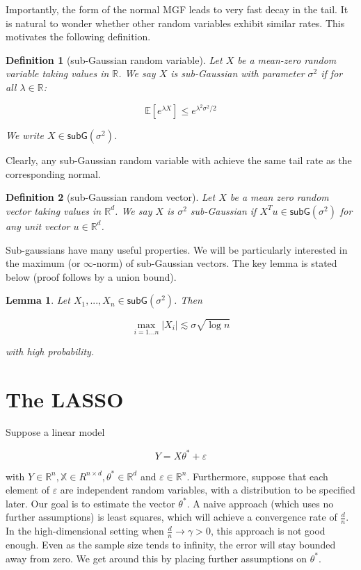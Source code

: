 \documentclass{article}
\newcommand{\R}{\mathbb{R}}
\newcommand{\X}{\mathbb{X}}
\newcommand{\ev}[1]{\mathbb{E}\left[#1\right]}
\newcommand{\subG}{\mathsf{subG}}
\newcommand{\eps}{\varepsilon} %
\newtheorem{lemma}{Lemma}
\newtheorem{definition}{Definition}
\begin{document}
Importantly, the form of the normal MGF leads to
very fast decay in the tail. It is natural to wonder whether other random
variables exhibit similar rates. This motivates the
following definition.

\begin{definition} [sub-Gaussian random variable]
	Let $X$ be a mean-zero random variable taking values in $\R$. We say $X$ is sub-Gaussian with
	parameter $\sigma^2$ if for all $\lambda \in \R$:

	$$\ev{e^{\lambda X}} \leq e^{\lambda^2\sigma^2 / 2}$$

	We write $X \in \subG(\sigma^2)$.
\end{definition} 

Clearly, any sub-Gaussian random variable with achieve the same tail rate as the
corresponding normal.

\begin{definition}[sub-Gaussian random vector]
	Let $X$ be a mean zero random vector taking values in $\R^d$. We say $X$
	is $\sigma^2$ sub-Gaussian  if $X^Tu \in \subG(\sigma^2)$ for any unit
	vector $u \in \R^d$.
\end{definition}

Sub-gaussians have many useful properties. We will be particularly interested in the maximum (or $\infty$-norm) of
sub-Gaussian vectors. The key lemma is stated below (proof follows by a union bound).

\begin{lemma}\label{lemma:maximal}
	Let $X_1, ..., X_n \in \subG(\sigma^2)$. Then

	$$\max_{i = 1...n}|X_i| \lesssim \sigma\sqrt{\log n}$$

	with high probability.
\end{lemma}

\section{The LASSO}


Suppose a linear model

$$Y = X\theta^{*} + \eps$$

with $Y \in \R^n, \X \in R^{n \times d}, \theta^{*} \in \R^{d}$ and $\eps \in \R^{n}$. Furthermore, suppose that each element of $\eps$ are independent random variables, with a distribution to be specified later. Our goal is to estimate the vector $\theta^{*}$. A naive approach (which uses no further assumptions) is least squares, which will achieve a convergence rate of $\frac{d}{n}$. In the high-dimensional setting when $\frac{d}{n} \rightarrow \gamma > 0$, this approach is not good enough. Even as the sample size tends to infinity, the error will stay bounded away from zero. We get around this by placing further assumptions on $\theta^{*}$.
\end{document}
